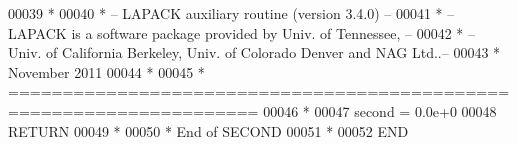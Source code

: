 \begin{DoxyCode}
00039 \textcolor{comment}{*}
00040 \textcolor{comment}{*  -- LAPACK auxiliary routine (version 3.4.0) --}
00041 \textcolor{comment}{*  -- LAPACK is a software package provided by Univ. of Tennessee,    --}
00042 \textcolor{comment}{*  -- Univ. of California Berkeley, Univ. of Colorado Denver and NAG Ltd..--}
00043 \textcolor{comment}{*     November 2011}
00044 \textcolor{comment}{*}
00045 \textcolor{comment}{* =====================================================================}
00046 \textcolor{comment}{*}
00047       second = 0.0e+0
00048       \textcolor{keywordflow}{RETURN}
00049 \textcolor{comment}{*}
00050 \textcolor{comment}{*     End of SECOND}
00051 \textcolor{comment}{*}
00052 \textcolor{keyword}{      END}
\end{DoxyCode}
